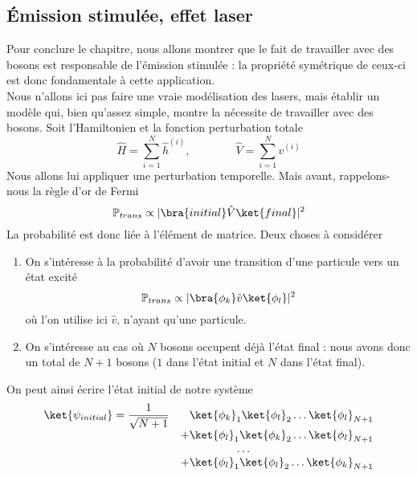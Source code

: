 \subsection{Émission stimulée, effet laser}
Pour conclure le chapitre, nous allons montrer que le fait de travailler avec des bosons est responsable 
de l'émission stimulée : la propriété symétrique de ceux-ci est donc fondamentale à cette application.\\

Nous n'allons ici pas faire une vraie modélisation des lasers, mais établir un modèle qui, bien qu'assez 
simple, montre la nécessite de travailler avec des bosons. Soit l'Hamiltonien et la fonction perturbation totale
\begin{equation}
\hat{H} = \sum_{i=1}^N \hat{h}^{(i)},\qquad\qquad\hat{V} = \sum_{i=1}^N v^{(i)}
\end{equation}
Nous allons lui appliquer une perturbation temporelle. Mais avant, rappelons-nous la règle d'or de Fermi
\begin{equation}
\mathbb{P}_{trans} \propto |\bra{initial}\hat{V}\ket{final}|^2
\end{equation}
La probabilité est donc liée à l'élément de matrice.  Deux  choses à considérer
\begin{enumerate}
\item On s'intéresse à la probabilité d'avoir une transition d'une particule vers un état excité
\begin{equation}
\mathbb{P}_{trans} \propto |\bra{\phi_k}\hat{v}\ket{\phi_l}|^2
\end{equation}
où l'on utilise ici $\hat{v}$, n'ayant qu'une particule.

\item On s'intéresse au cas où $N$ bosons occupent déjà l'état final : nous avons donc un total de 
$N+1$ bosons ($1$ dans l'état initial et $N$ dans l'état final).
\end{enumerate}
On peut ainsi écrire l'état initial de notre système
\begin{equation}
\begin{array}{ll}
\ket{\psi_{initial}} = \dfrac{1}{\sqrt{N+1}} &\phantom{+} \ket{\phi_k}_1\ket{\phi_l}_2\dots\ket{\phi_l}_{N+1}\\
&+ \ket{\phi_l}_1\ket{\phi_k}_2\dots\ket{\phi_l}_{N+1}\\
&\quad\qquad\qquad\dots\\
&+ \ket{\phi_l}_1\ket{\phi_l}_2\dots\ket{\phi_k}_{N+1}
\end{array}
\end{equation}
